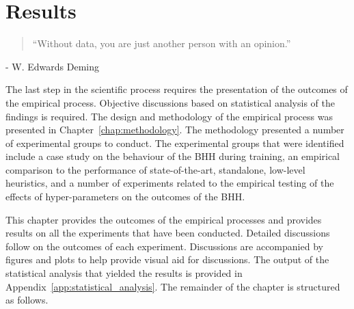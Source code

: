 \chapter{Results}
\label{chap:results}

\begin{quotation}
      \noindent ``Without data, you are just another person with an opinion.''
\end{quotation}
\begin{flushright}
      - W. Edwards Deming
\end{flushright}

The last step in the scientific process requires the presentation of the outcomes of the empirical process. Objective discussions based on statistical analysis of the findings is required. The design and methodology of the empirical process was presented in Chapter~\ref{chap:methodology}. The methodology presented a number of experimental groups to conduct. The experimental groups that were identified include a case study on the behaviour of the \acs{BHH} during training, an empirical comparison to the performance of state-of-the-art, standalone, low-level heuristics, and a number of experiments related to the empirical testing of the effects of hyper-parameters on the outcomes of the \acs{BHH}.

This chapter provides the outcomes of the empirical processes and provides results on all the experiments that have been conducted. Detailed discussions follow on the outcomes of each experiment. Discussions are accompanied by figures and plots to help provide visual aid for discussions. The output of the statistical analysis that yielded the results is provided in Appendix~\ref{app:statistical_analysis}. The remainder of the chapter is structured as follows.

